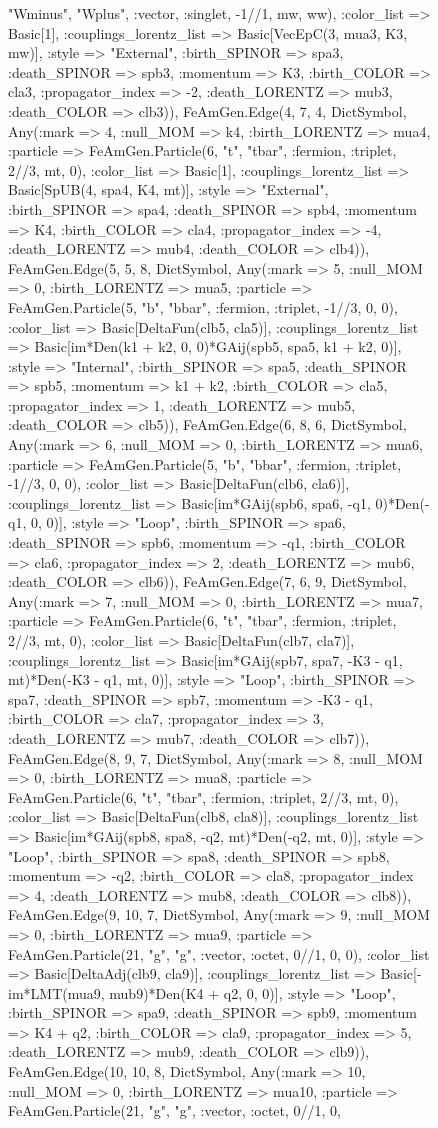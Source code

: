 \documentclass{revtex4}
\begin{document}
\begin{figure}[!htb]
\begin{center}
{"Wminus", "Wplus", :vector, :singlet, -1//1, mw, ww), :color_list => Basic[1], :couplings_lorentz_list => Basic[VecEpC(3, mua3, K3, mw)], :style => "External", :birth_SPINOR => spa3, :death_SPINOR => spb3, :momentum => K3, :birth_COLOR => cla3, :propagator_index => -2, :death_LORENTZ => mub3, :death_COLOR => clb3)), FeAmGen.Edge(4, 7, 4, Dict{Symbol, Any}(:mark => 4, :null_MOM => k4, :birth_LORENTZ => mua4, :particle => FeAmGen.Particle(6, "t", "tbar", :fermion, :triplet, 2//3, mt, 0), :color_list => Basic[1], :couplings_lorentz_list => Basic[SpUB(4, spa4, K4, mt)], :style => "External", :birth_SPINOR => spa4, :death_SPINOR => spb4, :momentum => K4, :birth_COLOR => cla4, :propagator_index => -4, :death_LORENTZ => mub4, :death_COLOR => clb4)), FeAmGen.Edge(5, 5, 8, Dict{Symbol, Any}(:mark => 5, :null_MOM => 0, :birth_LORENTZ => mua5, :particle => FeAmGen.Particle(5, "b", "bbar", :fermion, :triplet, -1//3, 0, 0), :color_list => Basic[DeltaFun(clb5, cla5)], :couplings_lorentz_list => Basic[im*Den(k1 + k2, 0, 0)*GAij(spb5, spa5, k1 + k2, 0)], :style => "Internal", :birth_SPINOR => spa5, :death_SPINOR => spb5, :momentum => k1 + k2, :birth_COLOR => cla5, :propagator_index => 1, :death_LORENTZ => mub5, :death_COLOR => clb5)), FeAmGen.Edge(6, 8, 6, Dict{Symbol, Any}(:mark => 6, :null_MOM => 0, :birth_LORENTZ => mua6, :particle => FeAmGen.Particle(5, "b", "bbar", :fermion, :triplet, -1//3, 0, 0), :color_list => Basic[DeltaFun(clb6, cla6)], :couplings_lorentz_list => Basic[im*GAij(spb6, spa6, -q1, 0)*Den(-q1, 0, 0)], :style => "Loop", :birth_SPINOR => spa6, :death_SPINOR => spb6, :momentum => -q1, :birth_COLOR => cla6, :propagator_index => 2, :death_LORENTZ => mub6, :death_COLOR => clb6)), FeAmGen.Edge(7, 6, 9, Dict{Symbol, Any}(:mark => 7, :null_MOM => 0, :birth_LORENTZ => mua7, :particle => FeAmGen.Particle(6, "t", "tbar", :fermion, :triplet, 2//3, mt, 0), :color_list => Basic[DeltaFun(clb7, cla7)], :couplings_lorentz_list => Basic[im*GAij(spb7, spa7, -K3 - q1, mt)*Den(-K3 - q1, mt, 0)], :style => "Loop", :birth_SPINOR => spa7, :death_SPINOR => spb7, :momentum => -K3 - q1, :birth_COLOR => cla7, :propagator_index => 3, :death_LORENTZ => mub7, :death_COLOR => clb7)), FeAmGen.Edge(8, 9, 7, Dict{Symbol, Any}(:mark => 8, :null_MOM => 0, :birth_LORENTZ => mua8, :particle => FeAmGen.Particle(6, "t", "tbar", :fermion, :triplet, 2//3, mt, 0), :color_list => Basic[DeltaFun(clb8, cla8)], :couplings_lorentz_list => Basic[im*GAij(spb8, spa8, -q2, mt)*Den(-q2, mt, 0)], :style => "Loop", :birth_SPINOR => spa8, :death_SPINOR => spb8, :momentum => -q2, :birth_COLOR => cla8, :propagator_index => 4, :death_LORENTZ => mub8, :death_COLOR => clb8)), FeAmGen.Edge(9, 10, 7, Dict{Symbol, Any}(:mark => 9, :null_MOM => 0, :birth_LORENTZ => mua9, :particle => FeAmGen.Particle(21, "g", "g", :vector, :octet, 0//1, 0, 0), :color_list => Basic[DeltaAdj(clb9, cla9)], :couplings_lorentz_list => Basic[-im*LMT(mua9, mub9)*Den(K4 + q2, 0, 0)], :style => "Loop", :birth_SPINOR => spa9, :death_SPINOR => spb9, :momentum => K4 + q2, :birth_COLOR => cla9, :propagator_index => 5, :death_LORENTZ => mub9, :death_COLOR => clb9)), FeAmGen.Edge(10, 10, 8, Dict{Symbol, Any}(:mark => 10, :null_MOM => 0, :birth_LORENTZ => mua10, :particle => FeAmGen.Particle(21, "g", "g", :vector, :octet, 0//1, 0, }
\end{center}
\end{figure}
\end{document}
